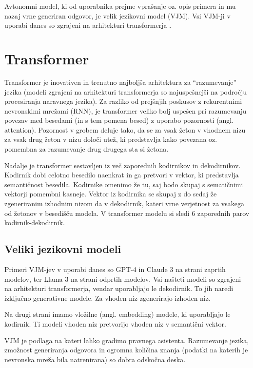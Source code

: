 \documentclass[a4paper,12pt,openright]{book}
\begin{document}
Avtonomni model, ki od uporabnika prejme vprašanje oz. opis primera in mu nazaj vrne generiran odgovor, je velik jezikovni model (VJM). Vsi VJM-ji v uporabi danes so zgrajeni na arhitekturi transformerja \cite{transformer}.

\section{Transformer}

Transformer je inovativen in trenutno najboljša arhitektura za “razumevanje” jezika (modeli zgrajeni na arhitekturi transformerja so najuspešnejši na področju procesiranja naravnega jezika). Za razliko od prejšnjih poskusov z rekurentnimi nevronskimi mrežami (RNN), je transformer veliko bolj uspešen pri razumevanju povezav med besedami (in s tem pomena besed) z uporabo pozornosti (angl. attention). Pozornost v grobem deluje tako, da se za vsak žeton v vhodnem nizu za vsak drug žeton v nizu določi utež, ki predstavlja kako povezana oz. pomembna za razumevanje drug drugega sta si žetona.

Nadalje je transformer sestavljen iz več zaporednih kodirnikov in dekodirnikov. Kodirnik dobi celotno besedilo naenkrat in ga pretvori v vektor, ki predstavlja semantičnost besedila. Kodirnike omenimo že tu, saj bodo skupaj s sematičnimi vektorji pomembni kasneje. Vektor iz kodirnika se skupaj z do sedaj že zgeneriranim izhodnim nizom da v dekodirnik, kateri vrne verjetnost za vsakega od žetonov v besedišču modela. V transformer modelu si sledi 6 zaporednih parov kodirnik-dekodirnik.

\subsection{Veliki jezikovni modeli}

Primeri VJM-jev v uporabi danes so GPT-4 \cite{gpt4} in Claude 3 \cite{claude3} na strani zaprtih modelov, ter Llama 3 \cite{llama3} na strani odprtih modelov. Vsi našteti modeli so zgrajeni na arhitekturi transformerja, vendar uporabljajo le dekodirnik. To jih naredi izključno generativne modele. Za vhoden niz zgenerirajo izhoden niz.

Na drugi strani imamo vložilne (angl. embedding) modele, ki uporabljajo le kodirnik. Ti modeli vhoden niz pretvorijo vhoden niz v semantični vektor.

VJM je podlaga na kateri lahko gradimo pravnega asistenta. Razumevanje jezika, zmožnost generiranja odgovora in ogromna količina znanja (podatki na katerih je nevronska mreža bila natrenirana) so dobra odskočna deska.
\end{document}

